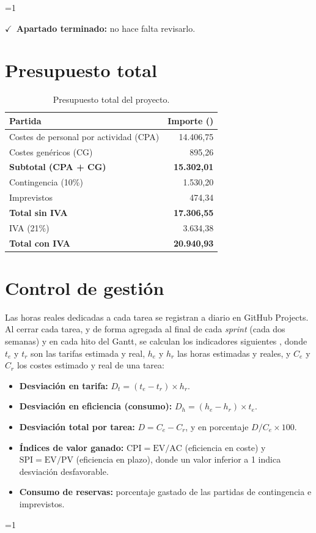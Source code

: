 \documentclass[12pt, a4paper, oneside]{report}
\newcommand{\mostrarterminados}{1}
\newenvironment{revisado}
  {\ifnum\mostrarterminados=1\relax\begin{cajarevisada}\noindent\colorbox{verdeterminado}{\parbox{\dimexpr\linewidth-2\fboxsep\relax}{\small$\checkmark$\ \textbf{Apartado terminado:} no hace falta revisarlo.}}\par\medskip\fi}
  {\ifnum\mostrarterminados=1\relax\end{cajarevisada}\fi}
\begin{document}
\begin{revisado}
\section{Presupuesto total}
\begin{table}[H]
\centering
\small
\renewcommand{\arraystretch}{1.05}
\begin{tabularx}{0.8\textwidth}{@{} X r @{}}
\toprule
\textbf{Partida} & \textbf{Importe (\texteuro{})} \\ \midrule
Costes de personal por actividad (CPA) & 14.406,75 \\
Costes genéricos (CG) & 895,26 \\ \midrule
\textbf{Subtotal (CPA + CG)} & \textbf{15.302,01} \\
Contingencia (10\%) & 1.530,20 \\
Imprevistos & 474,34 \\ \midrule
\textbf{Total sin IVA} & \textbf{17.306,55} \\
IVA (21\%) & 3.634,38 \\ \midrule
\textbf{Total con IVA} & \textbf{20.940,93} \\ \bottomrule
\end{tabularx}
\caption{Presupuesto total del proyecto.}
\label{tab:presupuesto}
\end{table}

\section{Control de gestión}
\label{sec:control}
Las horas reales dedicadas a cada tarea se registran a diario en GitHub Projects. Al cerrar cada tarea, y de forma agregada al final de cada \textit{sprint} (cada dos semanas) y en cada hito del Gantt, se calculan los indicadores siguientes \cite{fib_costos, pmi2021pmbok}, donde $t_e$ y $t_r$ son las tarifas estimada y real, $h_e$ y $h_r$ las horas estimadas y reales, y $C_e$ y $C_r$ los costes estimado y real de una tarea:
\begin{itemize}
    \item \textbf{Desviación en tarifa:} $D_t = (t_e - t_r) \times h_r$.
    \item \textbf{Desviación en eficiencia (consumo):} $D_h = (h_e - h_r) \times t_e$.
    \item \textbf{Desviación total por tarea:} $D = C_e - C_r$, y en porcentaje $D/C_e \times 100$.
    \item \textbf{Índices de valor ganado:} $\text{CPI} = \text{EV}/\text{AC}$ (eficiencia en coste) y $\text{SPI} = \text{EV}/\text{PV}$ (eficiencia en plazo), donde un valor inferior a 1 indica desviación desfavorable.
    \item \textbf{Consumo de reservas:} porcentaje gastado de las partidas de contingencia e imprevistos.
\end{itemize}


\end{revisado}
\end{document}
